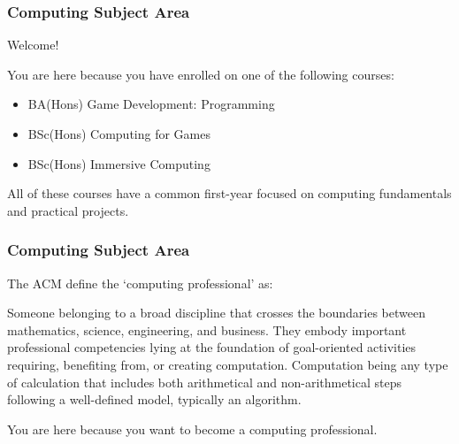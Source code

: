 \usepackage{../../beamerthemeFalmouthGamesAcademy}
\usepackage{multimedia}
\graphicspath{ {../../} }


\usepackage[normalem]{ulem}
\usepackage{wasysym}
\usepackage[T1]{fontenc}
\usepackage{pdfpages}

\usetikzlibrary{arrows,automata}







\title{\sessionnumber}
\subtitle{\modulecode: Computing Subject Area}

\frame{\titlepage} 

\begin{frame}
	\frametitle{Computing Subject Area}
	
	Welcome!
	
	\vspace{1em}
	
	You are here because you have enrolled on one of the following courses:
	
	\begin{itemize}
		\item BA(Hons) Game Development: Programming
		\item BSc(Hons) Computing for Games
		\item BSc(Hons) Immersive Computing
	\end{itemize}
	
	\vspace{1em}
	
	All of these courses have a common first-year focused on computing fundamentals and practical projects.

\end{frame}

\begin{frame}
	\frametitle{Computing Subject Area}
	
	The ACM define the `computing professional' as:
	
	\vspace{1em}
	
	Someone belonging to a broad discipline that crosses the boundaries between mathematics, science, engineering, and business. 
	They embody important professional competencies lying at the foundation of goal-oriented activities requiring, benefiting 
	from, or creating computation. Computation being any type of calculation that includes both arithmetical and non-arithmetical steps following a
	well-defined model, typically an algorithm.
	
	\vspace{1em}
	
	You are here because you want to become a computing professional.

\end{frame}

